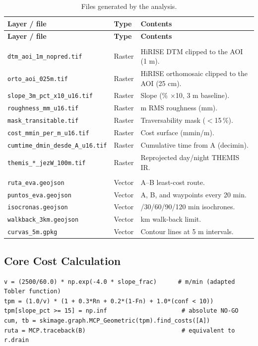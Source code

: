 \documentclass{article}
\begin{document}
{\small
\begin{longtable}{>{\raggedright\arraybackslash}p{5.6cm} >{\raggedright\arraybackslash}p{1.8cm} >{\raggedright\arraybackslash}p{8.1cm}}
\caption{Files generated by the analysis.}\label{tab:archivos}\\
\toprule
\textbf{Layer / file} & \textbf{Type} & \textbf{Contents} \\
\midrule
\endfirsthead
\toprule
\textbf{Layer / file} & \textbf{Type} & \textbf{Contents} \\
\midrule
\endhead
\multicolumn{3}{l}{\textit{02\_procesado}}\\
\texttt{dtm\_aoi\_1m\_nopred.tif} & Raster & HiRISE DTM clipped to the AOI (1 m). \\
\texttt{orto\_aoi\_025m.tif} & Raster & HiRISE orthomosaic clipped to the AOI (25 cm). \\
\texttt{slope\_3m\_pct\_x10\_u16.tif} & Raster & Slope (\% $\times$10, 3 m baseline). \\
\texttt{roughness\_mm\_u16.tif} & Raster & 5 m RMS roughness (mm). \\
\texttt{mask\_transitable.tif} & Raster & Traversability mask ($<$15\,\%). \\
\texttt{cost\_mmin\_per\_m\_u16.tif} & Raster & Cost surface (mmin/m). \\
\texttt{cumtime\_dmin\_desde\_A\_u16.tif} & Raster & Cumulative time from A (decimin). \\
\texttt{themis\_*\_jezW\_100m.tif} & Raster & Reprojected day/night THEMIS IR. \\
\multicolumn{3}{l}{\textit{03\_resultados}}\\
\texttt{ruta\_eva.geojson} & Vector & A--B least-cost route. \\
\texttt{puntos\_eva.geojson} & Vector & A, B, and waypoints every 20 min. \\
\texttt{isocronas.geojson} & Vector & 15/30/60/90/120 min isochrones. \\
\texttt{walkback\_3km.geojson} & Vector & 3 km walk-back limit. \\
\texttt{curvas\_5m.gpkg} & Vector & Contour lines at 5 m intervals. \\
\bottomrule
\end{longtable}
}

\subsection{Core Cost Calculation}

\begin{lstlisting}[style=estiloPython]
v = (2500/60.0) * np.exp(-4.0 * slope_frac)      # m/min (adapted Tobler function)
tpm = (1.0/v) * (1 + 0.3*Rn + 0.2*(1-Fn) + 1.0*(conf < 10))
tpm[slope_pct >= 15] = np.inf                     # absolute NO-GO
cum, tb = skimage.graph.MCP_Geometric(tpm).find_costs([A])
ruta = MCP.traceback(B)                           # equivalent to r.drain
\end{lstlisting}
\end{document}

